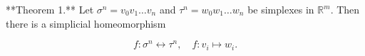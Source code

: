 **Theorem 1.** Let $\sigma^n = v_0v_1 \ldots v_n$ and $\tau^n = w_0w_1 \ldots w_n$ be simplexes in $\mathbb{R}^m$. Then there is a simplicial homeomorphism

$$f: \sigma^n \leftrightarrow \tau^n, \quad f: v_i \mapsto w_i.$$
